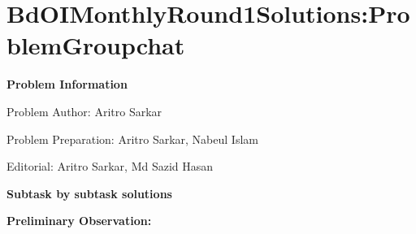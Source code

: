 \documentclass[12pt]{article}
\begin{document}
\section*{\textbf{BdOI\hspace{0.5em}Monthly\hspace{0.5em}Round\hspace{0.5em}1\hspace{0.5em}Solutions:\hspace{0.5em}Problem\hspace{0.5em}Groupchat}}

\vspace{0.3cm}

\textbf{\Large Problem Information}

\vspace{0.3cm}

{\large Problem Author: Aritro Sarkar}

\vspace{0.3cm}

{\large Problem Preparation: Aritro Sarkar, Nabeul Islam}

\vspace{0.3cm}

{\large Editorial: Aritro Sarkar, Md Sazid Hasan}

\vspace{0.3cm}



\vspace{0.5cm}

\textbf{\Large Subtask by subtask solutions}

\vspace{0.3cm}

\textbf{\large Preliminary Observation:}

\vspace{0.3cm}
\end{document}
